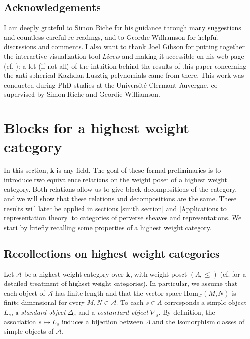 \documentclass[11pt]{amsart}
\theoremstyle{plain}
\theoremstyle{remark}
\numberwithin{equation}{section}
\begin{document}
	 \subsection{Acknowledgements}
	 I am deeply grateful to Simon Riche for his guidance through many suggestions and countless careful re-readings, and to Geordie Williamson for helpful discussions and comments. I also want to thank Joel Gibson for putting together the interactive visualization tool \textit{Lievis} and making it accessible on his web page (cf. \cite{Lievis}): a lot (if not all) of the intuition behind the results of this paper concerning the anti-spherical Kazhdan-Lusztig polynomials came from there. This work was conducted during PhD studies at the Universit\'e Clermont Auvergne, co-supervised by Simon Riche and Geordie Williamson.
	\section{Blocks for a highest weight category}\label{relation section}
	In this section, $\mathbf{k}$ is any field. The goal of these formal preliminaries is to introduce two equivalence relations on the weight poset of a highest weight category. Both relations allow us to give block decompositions of the category, and we will show that these relations and decompositions are the same. These results will later be applied in sections \ref{smith section} and \ref{Applications to representation theory} to categories of perverse sheaves and representations. We start by briefly recalling some properties of a highest weight category.
	\subsection{Recollections on highest weight categories}
	Let $\mathcal{A}$ be a highest weight category over $\mathbf{k}$, with weight poset $(\Lambda,\leq)$ (cf. \cite[3.7]{riche} for a detailed treatment of highest weight categories). In particular, we assume that each object of $\mathcal{A}$ has finite length and that the vector space $\mathrm{Hom}_\mathcal{A}(M,N)$ is finite dimensional for every $M,N\in \mathcal{A}$. To each $s\in\Lambda$ corresponds a simple object $L_s$, a \textit{standard object} $\Delta_s$ and a \textit{costandard object} $\nabla_s$. By definition, the association $s\mapsto L_s$ induces a bijection between $\Lambda$ and the isomorphism classes of simple objects of $\mathcal{A}$.
	
\end{document}
